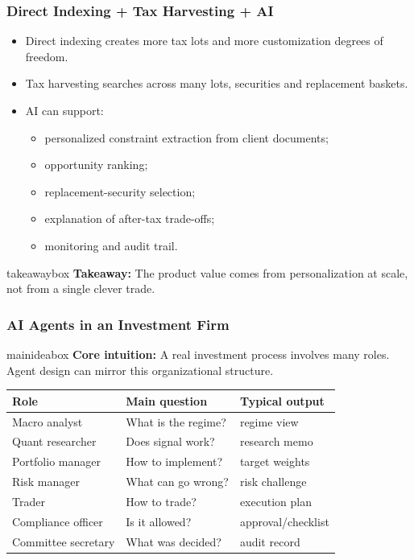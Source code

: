 \documentclass[aspectratio=169,12pt]{beamer}
\newcommand{\currentframetitle}{}
\newcommand{\slideTitle}[1]{\gdef\currentframetitle{#1}\frametitle{#1}}
\newcommand{\mainidea}[1]{%
  \vspace{0.08cm}
  \begin{beamercolorbox}[wd=\linewidth,rounded=true,sep=0.18cm]{mainideabox}
    \small\textbf{Core intuition:} #1
  \end{beamercolorbox}%
}
\newcommand{\takeaway}[1]{%
  \vspace{0.08cm}
  \begin{beamercolorbox}[wd=\linewidth,rounded=true,sep=0.18cm]{takeawaybox}
    \small\textbf{Takeaway:} #1
  \end{beamercolorbox}%
}
\begin{document}
\begin{frame}
\slideTitle{Direct Indexing + Tax Harvesting + AI}
\begin{itemize}
  \item Direct indexing creates more tax lots and more customization degrees of freedom.
  \item Tax harvesting searches across many lots, securities and replacement baskets.
  \item AI can support:
  \begin{itemize}
    \item personalized constraint extraction from client documents;
    \item opportunity ranking;
    \item replacement-security selection;
    \item explanation of after-tax trade-offs;
    \item monitoring and audit trail.
  \end{itemize}
\end{itemize}
\takeaway{The product value comes from personalization at scale, not from a single clever trade.}
\end{frame}



\begin{frame}
\slideTitle{AI Agents in an Investment Firm}
\mainidea{A real investment process involves many roles. Agent design can mirror this organizational structure.}
\begin{center}
\scriptsize
\begin{tabular}{lll}
\toprule
Role & Main question & Typical output \\
\midrule
Macro analyst & What is the regime? & regime view \\
Quant researcher & Does signal work? & research memo \\
Portfolio manager & How to implement? & target weights \\
Risk manager & What can go wrong? & risk challenge \\
Trader & How to trade? & execution plan \\
Compliance officer & Is it allowed? & approval/checklist \\
Committee secretary & What was decided? & audit record \\
\bottomrule
\end{tabular}
\end{center}
\end{frame}
\end{document}
